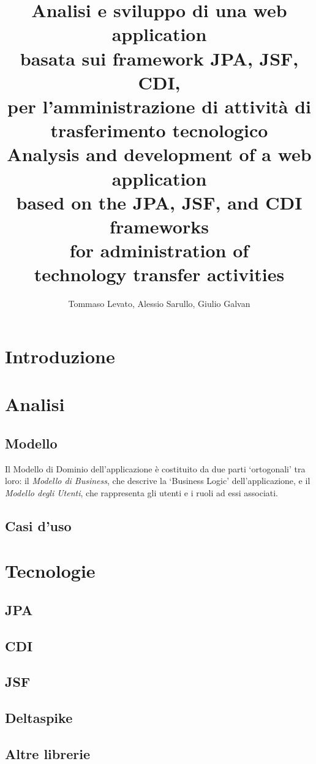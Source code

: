 \documentclass[italian,laurea,twoside,10pt]{UFtesi}
\title{Analisi e sviluppo di una web application \\
basata sui framework JPA, JSF, CDI, \\
per l'amministrazione di attività di trasferimento tecnologico\\\vspace{1.5cm}
Analysis and development of a web application \\
based on the JPA, JSF, and CDI frameworks \\
for administration of \\
technology transfer activities
}
\author{Tommaso Levato, Alessio Sarullo, Giulio Galvan}
\date{}
\begin{document}
\maketitle
\frontmatter



\tableofcontents
\mainmatter
\chapter{Introduzione}


\chapter{Analisi}
\label{analisi}

\section{Modello}
Il Modello di Dominio dell'applicazione è costituito da due parti \textquoteleft ortogonali' tra loro: il \textsl{Modello di Business},
che descrive la \textquoteleft Business Logic' dell'applicazione, e il \textsl{Modello degli Utenti}, che rappresenta gli utenti e i ruoli ad essi associati.


\section{Casi d'uso}



\chapter{Tecnologie}
\label{tecnologie}

\section{JPA}
\label{jpa}

\section{CDI} 
\label{cdi}

\section{JSF}
\label{jsf}

\section{Deltaspike}
\label{delta}

\section{Altre librerie}
\label{libs}
\end{document}
